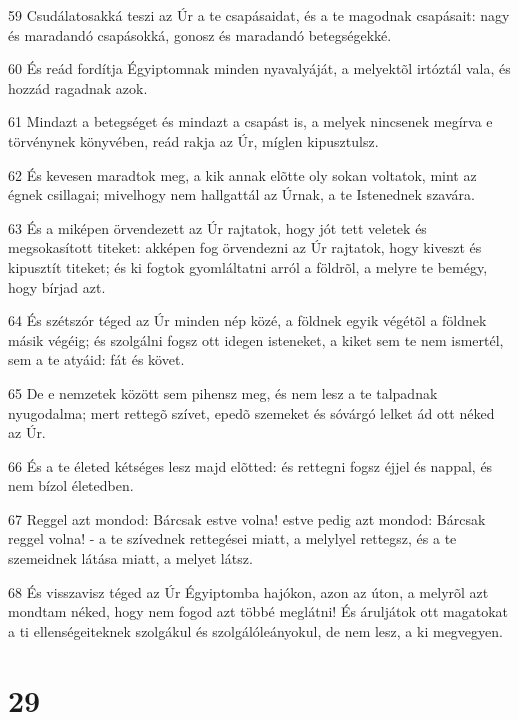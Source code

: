 \par 59 Csudálatosakká teszi az Úr a te csapásaidat, és a te magodnak csapásait: nagy és maradandó csapásokká, gonosz és maradandó betegségekké.
\par 60 És reád fordítja Égyiptomnak minden nyavalyáját, a melyektõl irtóztál vala, és hozzád ragadnak azok.
\par 61 Mindazt a betegséget és mindazt a csapást is, a melyek nincsenek megírva e törvénynek könyvében, reád rakja az Úr, míglen kipusztulsz.
\par 62 És kevesen maradtok meg, a kik annak elõtte oly sokan  voltatok, mint az égnek csillagai; mivelhogy nem hallgattál az Úrnak, a te Istenednek szavára.
\par 63 És a miképen örvendezett az Úr rajtatok, hogy jót tett veletek és megsokasított titeket: akképen fog örvendezni az Úr rajtatok, hogy kiveszt és kipusztít titeket; és ki fogtok gyomláltatni arról a földrõl, a melyre te bemégy, hogy bírjad azt.
\par 64 És szétszór téged az Úr minden nép közé, a földnek egyik végétõl a földnek másik végéig; és szolgálni fogsz ott idegen isteneket, a kiket sem te nem ismertél, sem a te atyáid: fát és követ.
\par 65 De e nemzetek között sem pihensz meg, és nem lesz a te talpadnak nyugodalma; mert rettegõ szívet, epedõ szemeket és sóvárgó lelket ád ott néked az Úr.
\par 66 És a te életed kétséges lesz majd elõtted: és rettegni fogsz éjjel és nappal, és nem bízol életedben.
\par 67 Reggel azt mondod: Bárcsak estve volna! estve pedig azt mondod: Bárcsak reggel volna! - a te szívednek rettegései miatt, a melylyel rettegsz, és a te szemeidnek látása miatt, a melyet látsz.
\par 68 És visszavisz téged az Úr Égyiptomba hajókon, azon az úton, a melyrõl azt mondtam néked, hogy nem fogod azt többé meglátni! És áruljátok ott magatokat a ti ellenségeiteknek szolgákul és szolgálóleányokul, de nem lesz, a ki megvegyen.

\chapter{29}

